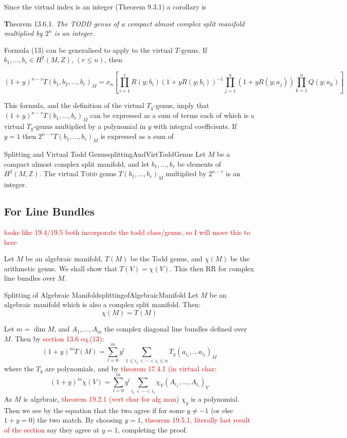 \documentclass{book}
\renewcommand{\bf}[1]{\textbf{#1}}
\begin{document}
Since the virtual index is an integer ({\color{red}Theorem 9.3.1}) a corollary is

{\bf Theorem 13.6.1.} {\it The TODD genus of a compact almost complex split manifold multiplied by $2^n$ is an integer.}

Formula (13) can be generalised to apply to the virtual $T$-genus. If $b_1,\ldots,b_r \in H^2(M,Z)$, $(r\leq n)$, then

\[
(1+y)^{n-r} T(b_1,b_2,\ldots,b_r)_M = x_n\left[\prod_{i=1}^r R(y;b_i)(1+yR(y;b_i))^{-1}\prod_{j=1}^n(1+yR(y;a_j))\prod_{k=1}^n Q(y;a_k)\right] \tag{14}
\]

This formula, and the definition of the virtual $T_y$-genus, imply that $(1+y)^{n-r}T(b_1,\ldots,b_r)_M$ can be expressed as a sum of terms each of which is a virtual $T_y$-genus multiplied by a polynomial in $y$ with integral coefficients. If $y=1$ then $2^{n-r}T(b_1,\ldots,b_r)_M$ is expressed as a sum of

\begin{thm}{Splitting and Virtual Todd Genus}{splittingAndVirtToddGenus}
Let $M$ be a compact almost complex split manifold, and let $b_1,\ldots,b_r$ be elements of
$H^2(M,\mathbb{Z})$. The virtual \textsc{Todd} genus $T(b_1,\ldots,b_r)_M$ multiplied by $2^{n-r}$ is an
integer.
\end{thm}


\subsection{For Line Bundles}\label{sec:HRRlineBundle}


\textcolor{red}{looks like 19.4/19.5 both incorporate the todd class/genus, so I will move this to here}

Let $M$ be an algebraic manifold, $T(M)$ be the Todd genus, and $\chi(M)$ be the arithmetic genus. We shall
show that $T(V) = \chi(V)$. This then RR for complex line bundles over $M$.

\begin{thm}{Splitting of Algebraic Manifold}{splittingofAlgebraicManifold}
  Let $M$ be an algebraic manifold which is also a complex split manifold. Then:
  \[
    \chi(M) = T(M)
  \]
\end{thm}

\begin{Proof}
  Let $m = \dim M$, and $A_1, ..., A_m$ the complex diagonal line bundles defined over $M$. Then by
  \textcolor{red}{section 13.6 eq.(13)}:
  \[
    (1+y)^m T(M) = \sum_{l=0}^my^l \sum_{1 \le i_1 < \cdots < i_l\le n} T_y(a_{i_1}, ... a_{i_l})_M
  \]
  where the $T_y$ are polynomials, and by \textcolor{red}{theorem 17.4.1 (in virtual char}:
  \[
  (1 + y)^m \chi(V) = \sum_{l=0}^m y^l \sum_{i_1 < \cdots < i_l} \chi_V(A_{i_1}, \ldots, A_{i_l})_V
  \]
  As $M$ is algebraic, \textcolor{red}{theorem 19.2.1 (vert char for alg man)} $\chi_y$ is a polynomial. Then
  we see by the equation that the two agree if for some $y\ne -1$ (or else $1+y = 0$) the two match. By
  choosing $y = 1$, \textcolor{red}{theorem 19.5.1, literally last result of the section} say they agree at
  $y=1$, completing the proof.
\end{Proof}
\end{document}
